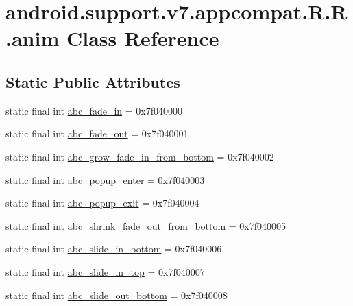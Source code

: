 \hypertarget{classandroid_1_1support_1_1v7_1_1appcompat_1_1_r_1_1anim}{
\section{android.support.v7.appcompat.R.R.anim Class Reference}
\label{classandroid_1_1support_1_1v7_1_1appcompat_1_1_r_1_1anim}
}
\subsection*{Static Public Attributes}
\begin{CompactItemize}
\item 
static final int \hyperlink{classandroid_1_1support_1_1v7_1_1appcompat_1_1_r_1_1anim_3fe83bd68712426bfdb47a543f274bce}{abc\_\-fade\_\-in} = 0x7f040000
\item 
static final int \hyperlink{classandroid_1_1support_1_1v7_1_1appcompat_1_1_r_1_1anim_d2b65c521e9d62f11422cedae1a2ae37}{abc\_\-fade\_\-out} = 0x7f040001
\item 
static final int \hyperlink{classandroid_1_1support_1_1v7_1_1appcompat_1_1_r_1_1anim_3bfe4d4f22ffbca481e96c8334c5d958}{abc\_\-grow\_\-fade\_\-in\_\-from\_\-bottom} = 0x7f040002
\item 
static final int \hyperlink{classandroid_1_1support_1_1v7_1_1appcompat_1_1_r_1_1anim_6640c6d23fe839845c83126f269615db}{abc\_\-popup\_\-enter} = 0x7f040003
\item 
static final int \hyperlink{classandroid_1_1support_1_1v7_1_1appcompat_1_1_r_1_1anim_b29274de8b23b867eb50139ca0b33728}{abc\_\-popup\_\-exit} = 0x7f040004
\item 
static final int \hyperlink{classandroid_1_1support_1_1v7_1_1appcompat_1_1_r_1_1anim_ea428c327ddb668b0ddfb128cfcaf3b7}{abc\_\-shrink\_\-fade\_\-out\_\-from\_\-bottom} = 0x7f040005
\item 
static final int \hyperlink{classandroid_1_1support_1_1v7_1_1appcompat_1_1_r_1_1anim_5455958468b677b502d047213ba0cfba}{abc\_\-slide\_\-in\_\-bottom} = 0x7f040006
\item 
static final int \hyperlink{classandroid_1_1support_1_1v7_1_1appcompat_1_1_r_1_1anim_333487deecb252cdae314ebbb560ef8d}{abc\_\-slide\_\-in\_\-top} = 0x7f040007
\item 
static final int \hyperlink{classandroid_1_1support_1_1v7_1_1appcompat_1_1_r_1_1anim_4fe9e67b4088eca4f9dfe38c24f28cf0}{abc\_\-slide\_\-out\_\-bottom} = 0x7f040008
\item 

\end{CompactItemize}
